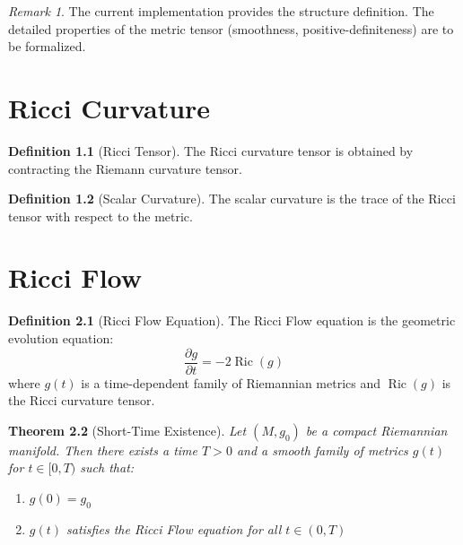 \documentclass[a4paper]{report}
\newtheorem{theorem}{Theorem}[section]
\theoremstyle{definition}
\newtheorem{definition}[theorem]{Definition}
\theoremstyle{remark}
\newtheorem{remark}[theorem]{Remark}
\begin{document}
\begin{remark}
The current implementation provides the structure definition. The detailed properties of the metric tensor (smoothness, positive-definiteness) are to be formalized.
\end{remark}

\chapter{Ricci Curvature}
\label{chap:ricci}

\begin{definition}[Ricci Tensor]
\label{def:ricci-tensor}
The Ricci curvature tensor is obtained by contracting the Riemann curvature tensor.
\end{definition}

\begin{definition}[Scalar Curvature]
\label{def:scalar-curvature}
The scalar curvature is the trace of the Ricci tensor with respect to the metric.
\end{definition}

\chapter{Ricci Flow}
\label{chap:flow}

\begin{definition}[Ricci Flow Equation]
\label{def:ricci-flow-equation}
The Ricci Flow equation is the geometric evolution equation:
\[
\frac{\partial g}{\partial t} = -2 \operatorname{Ric}(g)
\]
where $g(t)$ is a time-dependent family of Riemannian metrics and $\operatorname{Ric}(g)$ is the Ricci curvature tensor.
\end{definition}

\begin{theorem}[Short-Time Existence]
\label{thm:short-time-existence}
Let $(M, g_0)$ be a compact Riemannian manifold. Then there exists a time $T > 0$ and a smooth family of metrics $g(t)$ for $t \in [0, T)$ such that:
\begin{enumerate}
\item $g(0) = g_0$
\item $g(t)$ satisfies the Ricci Flow equation for all $t \in (0, T)$
\end{enumerate}
\end{theorem}
\end{document}
